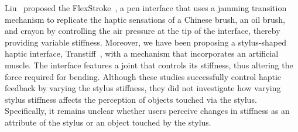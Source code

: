 
Liu \etal\ proposed the FlexStroke~\cite{FlexStroke}, a pen interface that uses a jamming transition mechanism to replicate the haptic sensations of a Chinese brush, an oil brush, and crayon by controlling the air pressure at the tip of the interface, thereby providing variable stiffness. 
Moreover, we have been proposing a stylus-shaped haptic interface, Transtiff~\cite{ogura_uist, ogura_siggraph}, with a mechanism that incorporates an artificial muscle.
The interface features a joint that controls its stiffness, thus altering the force required for bending.
Although these studies successfully control haptic feedback by varying the stylus stiffness, they did not investigate how varying stylus stiffness affects the perception of objects touched via the stylus.
Specifically, it remains unclear whether users perceive changes in stiffness as an attribute of the stylus or an object touched by the stylus.  

